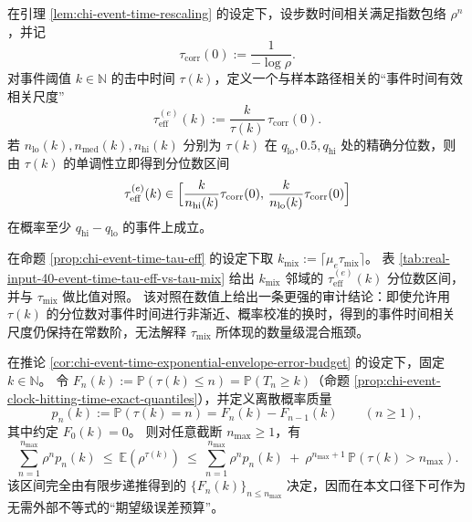 

\begin{remark}
\label{prop:chi-event-time-tau-eff}
在引理 \ref{lem:chi-event-time-rescaling} 的设定下，设步数时间相关满足指数包络 $\rho^n$，并记
$$
\tau_{\mathrm{corr}}(0):=\frac{1}{-\log\rho}.
$$
对事件阈值 $k\in\mathbb{N}$ 的击中时间 $\tau(k)$，定义一个与样本路径相关的“事件时间有效相关尺度”
$$
\tau_{\mathrm{eff}}^{(e)}(k):=\frac{k}{\tau(k)}\,\tau_{\mathrm{corr}}(0).
$$
若 $n_{\mathrm{lo}}(k),n_{\mathrm{med}}(k),n_{\mathrm{hi}}(k)$ 分别为 $\tau(k)$ 在 $q_{\mathrm{lo}},0.5,q_{\mathrm{hi}}$ 处的精确分位数，则由 $\tau(k)$ 的单调性立即得到分位数区间
$$
\tau_{\mathrm{eff}}^{(e)}(k)\in\Bigl[\frac{k}{n_{\mathrm{hi}}(k)}\tau_{\mathrm{corr}}(0),\,\frac{k}{n_{\mathrm{lo}}(k)}\tau_{\mathrm{corr}}(0)\Bigr]
$$
在概率至少 $q_{\mathrm{hi}}-q_{\mathrm{lo}}$ 的事件上成立。
\end{remark}

\begin{remark}
\label{cor:chi-event-time-tau-eff-vs-tau-mix}
在命题 \ref{prop:chi-event-time-tau-eff} 的设定下取 $k_{\mathrm{mix}}:=\lceil\mu_e\tau_{\mathrm{mix}}\rceil$。
表 \ref{tab:real-input-40-event-time-tau-eff-vs-tau-mix} 给出 $k_{\mathrm{mix}}$ 邻域的 $\tau_{\mathrm{eff}}^{(e)}(k)$ 分位数区间，并与 $\tau_{\mathrm{mix}}$ 做比值对照。
该对照在数值上给出一条更强的审计结论：即使允许用 $\tau(k)$ 的分位数对事件时间进行非渐近、概率校准的换时，得到的事件时间相关尺度仍保持在常数阶，无法解释 $\tau_{\mathrm{mix}}$ 所体现的数量级混合瓶颈。
\end{remark}



\begin{remark}
\label{prop:chi-event-time-rho-tau-expectation}
在推论 \ref{cor:chi-event-time-exponential-envelope-error-budget} 的设定下，固定 $k\in\mathbb{N}$。
令 $F_n(k):=\mathbb{P}(\tau(k)\le n)=\mathbb{P}(T_n\ge k)$（命题 \ref{prop:chi-event-clock-hitting-time-exact-quantiles}），并定义离散概率质量
$$
p_n(k):=\mathbb{P}(\tau(k)=n)=F_n(k)-F_{n-1}(k)\qquad (n\ge 1),
$$
其中约定 $F_0(k)=0$。
则对任意截断 $n_{\max}\ge 1$，有
$$
\sum_{n=1}^{n_{\max}}\rho^n p_n(k)\ \le\ \mathbb{E}(\rho^{\tau(k)})\ \le\ \sum_{n=1}^{n_{\max}}\rho^n p_n(k)\ +\ \rho^{n_{\max}+1}\,\mathbb{P}(\tau(k)>n_{\max}).
$$
该区间完全由有限步递推得到的 $\{F_n(k)\}_{n\le n_{\max}}$ 决定，因而在本文口径下可作为无需外部不等式的“期望级误差预算”。
\end{remark}


